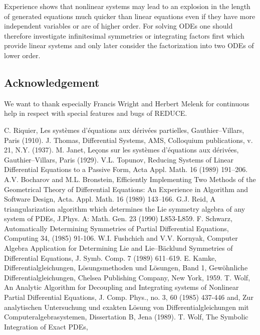 Experience shows that nonlinear systems may lead to an
explosion in the length of generated equations much quicker 
than linear equations
even if they have more independent variables or are of higher order.
For solving ODEs one should therefore investigate infinitesimal
symmetries or integrating factors first which provide linear systems
and only later consider the factorization into two ODEs of lower order.

\subsection{Acknowledgement}
We want to thank especially Francis Wright and Herbert Melenk for
continuous help in respect with special features and bugs of REDUCE.

\newpage
\begin{thebibliography}{99}
 C. Riquier, Les syst\`{e}mes d'\'{e}quations aux d\'{e}riv\'{e}es
partielles, Gauthier--Villars, Paris (1910).
 J. Thomas, Differential Systems, AMS, Colloquium
publications, v. 21, N.Y. (1937).
 M. Janet, Le\c{c}ons sur les syst\`{e}mes d'\'{e}quations aux 
d\'{e}riv\'{e}es, Gauthier--Villars, Paris (1929).
 V.L. Topunov, Reducing Systems of Linear Differential
Equations to a Passive Form, Acta Appl. Math. 16 (1989) 191--206.
 A.V. Bocharov and M.L. Bronstein, Efficiently
Implementing Two Methods of the Geometrical Theory of Differential
Equations: An Experience in Algorithm and Software Design, Acta. Appl.
Math. 16 (1989) 143--166.
 G.J. Reid, A triangularization algorithm which
determines the Lie symmetry algebra of any system of PDEs, J.Phys. A:
Math. Gen. 23 (1990) L853-L859.
 F. Schwarz, Automatically Determining Symmetries of Partial
Differential Equations, Computing 34, (1985) 91-106.
 W.I. Fushchich and V.V. Kornyak, Computer Algebra
Application for Determining Lie and Lie--B\"{a}cklund Symmetries of
Differential Equations, J. Symb. Comp. 7 (1989) 611--619.
 E. Kamke, Differentialgleichungen, L\"{o}sungsmethoden
und L\"{o}sungen, Band 1, Gew\"{o}hnliche Differentialgleichungen,
Chelsea Publishing Company, New York, 1959.
 T. Wolf, An Analytic Algorithm for Decoupling and Integrating
systems of Nonlinear Partial Differential Equations, J. Comp. Phys.,
no. 3, 60 (1985) 437-446 and, Zur analytischen Untersuchung und exakten
L\"{o}sung von Differentialgleichungen mit Computeralgebrasystemen,
Dissertation B, Jena (1989).
 T. Wolf, The Symbolic Integration of Exact PDEs,

\end{thebibliography}
